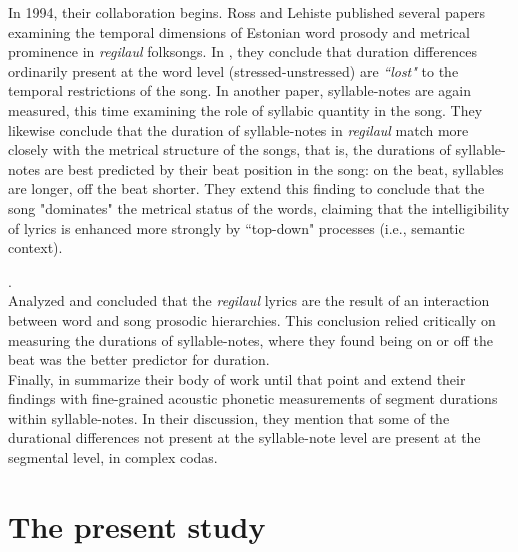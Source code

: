 In 1994, their collaboration begins. Ross and Lehiste published several papers examining the temporal dimensions of Estonian word prosody and metrical prominence in {\it regilaul} folksongs. In \citep{rossLehiste1994}, they conclude that duration differences ordinarily present at the word level (stressed-unstressed) are {\it ``lost"} to the temporal restrictions of the song. In another paper, syllable-notes are again measured, this time examining the role of syllabic quantity in the song. They likewise conclude that the duration of syllable-notes in {\it regilaul} match more closely with the metrical structure of the songs, that is, the durations of syllable-notes are best predicted by their beat position in the song: on the beat, syllables are longer, off the beat shorter. They extend this finding to conclude that the song "dominates" the metrical status of the words, claiming that the intelligibility of lyrics is enhanced more strongly by ``top-down" processes (i.e., semantic context). 

\citep{rossLehiste1996}. \\

\citep{rossLehiste1998} Analyzed and concluded that the {\it regilaul} lyrics are the result of an interaction between word and song prosodic hierarchies. This conclusion relied critically on measuring the durations of syllable-notes, where they found being on or off the beat was the better predictor for duration. \\


Finally, in \citep{rossLehiste2001} summarize their body of work until that point and extend their findings with fine-grained acoustic phonetic measurements of segment durations within syllable-notes. In their discussion, they mention that some of the durational differences not present at the syllable-note level are present at the segmental level, in complex codas. 

\section{The present study}

